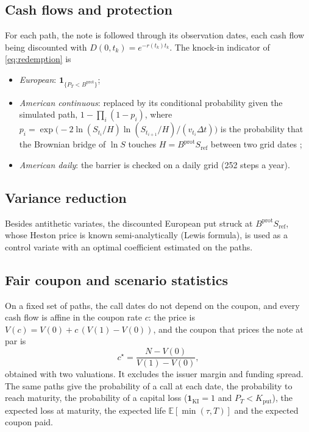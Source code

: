 \documentclass[11pt,a4paper]{article}
\newcommand{\E}{\mathbb{E}}
\newcommand{\ind}{\mathbf{1}}
\newcommand{\Sref}{S_{\mathrm{ref}}}
\begin{document}
\subsection{Cash flows and protection}
For each path, the note is followed through its observation dates, each cash flow
being discounted with $D(0,t_k) = e^{-r(t_k) t_k}$. The knock-in indicator of \eqref{eq:redemption} is
\begin{itemize}
\item \emph{European}: $\ind_{\{P_T < B^{\mathrm{prot}}\}}$;
\item \emph{American continuous}: replaced by its conditional probability given the simulated path,
$1 - \prod_i (1 - p_i)$, where
$p_i = \exp\!\big(-2 \ln(S_{t_i}/H) \ln(S_{t_{i+1}}/H) / (v_{t_i}\Delta t)\big)$ is the probability that the
Brownian bridge of $\ln S$ touches $H = B^{\mathrm{prot}}\Sref$ between two grid dates \cite{beaglehole1997};
\item \emph{American daily}: the barrier is checked on a daily grid (252 steps a year).
\end{itemize}

\subsection{Variance reduction}
Besides antithetic variates, the discounted European put struck at $B^{\mathrm{prot}}\Sref$, whose Heston price
is known semi-analytically (Lewis formula), is used as a control variate with an optimal coefficient estimated on
the paths.

\subsection{Fair coupon and scenario statistics}
On a fixed set of paths, the call dates do not depend on the coupon, and every cash flow is affine in the coupon
rate $c$: the price is $V(c) = V(0) + c\,(V(1) - V(0))$, and the coupon that prices the note at par is
\begin{equation}
c^\star = \frac{N - V(0)}{V(1) - V(0)},
\end{equation}
obtained with two valuations. It excludes the issuer margin and funding spread. The same paths give the
probability of a call at each date, the probability to reach maturity, the probability of a capital loss
($\ind_{\mathrm{KI}} = 1$ and $P_T < K_{\mathrm{put}}$), the expected loss at maturity, the expected life
$\E[\min(\tau, T)]$ and the expected coupon paid.
\end{document}
